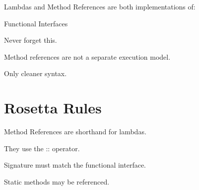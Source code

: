 \documentclass[11pt,a4paper]{book}
\begin{document}
Lambdas and Method References
are both implementations of:


Functional Interfaces


Never forget this.


Method references are not
a separate execution model.


Only cleaner syntax.


\section{Rosetta Rules}

\begin{rosettarule}

Method References are shorthand for lambdas.

\end{rosettarule}


\begin{rosettarule}

They use the :: operator.

\end{rosettarule}


\begin{rosettarule}

Signature must match the functional interface.

\end{rosettarule}


\begin{rosettarule}

Static methods may be referenced.

\end{rosettarule}

\end{document}
